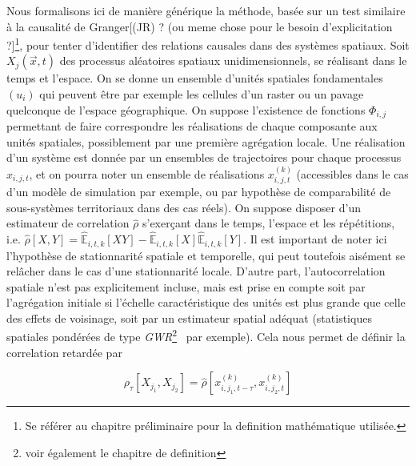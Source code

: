 {Nous formalisons ici de manière générique la méthode, basée sur un test similaire à la causalité de Granger[(JR) ? (ou meme chose pour le besoin d'explicitation ?]\footnote{Se référer au chapitre préliminaire pour la definition mathématique utilisée.}, pour tenter d'identifier des relations causales dans des systèmes spatiaux. Soit $X_j(\vec{x},t)$ des processus aléatoires spatiaux unidimensionnels, se réalisant dans le temps et l'espace. On se donne un ensemble d'unités spatiales fondamentales $(u_i)$ qui peuvent être par exemple les cellules d'un raster ou un pavage quelconque de l'espace géographique. On suppose l'existence de fonctions $\Phi_{i,j}$ permettant de faire correspondre les réalisations de chaque composante aux unités spatiales, possiblement par une première agrégation locale. Une réalisation d'un système est donnée par un ensembles de trajectoires pour chaque processus $x_{i,j,t}$, et on pourra noter un ensemble de réalisations $x^{(k)}_{i,j,t}$ (accessibles dans le cas d'un modèle de simulation par exemple, ou par hypothèse de comparabilité de sous-systèmes territoriaux dans des cas réels). On suppose disposer d'un estimateur de correlation $\hat{\rho}$ s'exerçant dans le temps, l'espace et les répétitions, i.e. $\hat{\rho}\left[X,Y\right] = \hat{\mathbb{E}}_{i,t,k}\left[XY\right] - \hat{\mathbb{E}}_{i,t,k}\left[X\right]\hat{\mathbb{E}}_{i,t,k}\left[Y\right]$. Il est important de noter ici l'hypothèse de stationnarité spatiale et temporelle, qui peut toutefois aisément se relâcher dans le cas d'une stationnarité locale. D'autre part, l'autocorrelation spatiale n'est pas explicitement incluse, mais est prise en compte soit par l'agrégation initiale si l'échelle caractéristique des unités est plus grande que celle des effets de voisinage, soit par un estimateur spatial adéquat (statistiques spatiales pondérées de type \emph{GWR}\footnote{voir également le chapitre de definition}~\cite{brunsdon1998geographically} par exemple). Cela nous permet de définir la correlation retardée par
}

\begin{equation}
\rho_{\tau}\left[X_{j_1},X_{j_2}\right] = \hat{\rho}\left[x^{(k)}_{i,j_1,t - \tau},x^{(k)}_{i,j_2,t}\right]
\end{equation}

